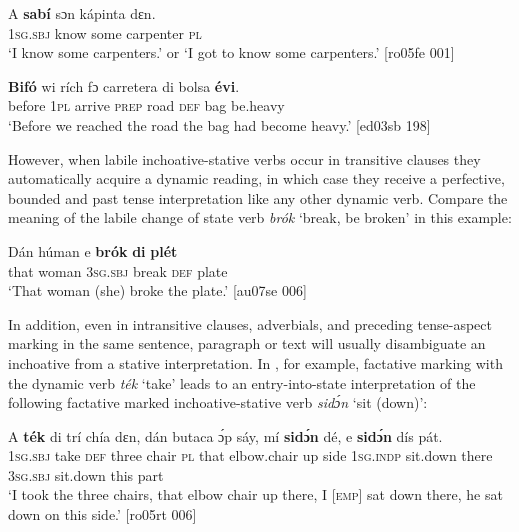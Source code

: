 \ea%
    \label{ex:key:316}
    \gll \MakeUppercase{A}   \textbf{sabí}    sɔn    kápinta    dɛn.\\
\textsc{1sg.sbj}  know  some  carpenter  \textsc{pl}\\

\glt ‘I know some carpenters.’ or ‘I got to know some carpenters.’ [ro05fe 001]
\z


\ea%
    \label{ex:key:317}
    \gll \textbf{Bifó}    wi  rích    fɔ  carretera  di  bolsa  \textbf{évi}.\\
before  \textsc{1pl}  arrive  \textsc{prep}  road      \textsc{def}  bag    be.heavy\\

\glt ‘Before we reached the road the bag had become heavy.’ [ed03sb 198]
\z

However, when labile inchoative-stative verbs occur in transitive clauses they automatically acquire a dynamic reading, in which case they receive a perfective, bounded and past tense interpretation like any other dynamic verb. Compare the meaning of the labile change of state verb \textit{brók} `break, be broken’ in this example: 


\ea%
    \label{ex:key:318}
    \gll Dán  húman  e    \textbf{brók}  \textbf{di}   \textbf{plét}\\
that  woman  \textsc{3sg.sbj}  break  \textsc{def}   plate\\

\glt ‘That woman (she) broke the plate.’ [au07se 006]
\z

In addition, even in intransitive clauses, adverbials, and preceding tense-aspect marking in the same sentence, paragraph or text will usually disambiguate an inchoative from a stative interpretation. In , for example, factative marking with the dynamic verb \textit{ték} ‘take’ leads to an entry-into-state interpretation of the following factative marked inchoative-stative verb \textit{sidɔ́n} ‘sit (down)’:


\ea%
    \label{ex:key:319}
    \gll \MakeUppercase{A}   \textbf{ték}    di  trí    chía    dɛn,    dán    butaca    ɔ́p  sáy,
mí    \textbf{sidɔ́n}  dé,    e    \textbf{sidɔ́n}  dís  pát.\\
\textsc{1sg.sbj}  take    \textsc{def}  three  chair  \textsc{pl}    that    elbow.chair  up  side
\textsc{1sg.indp}  sit.down  there  \textsc{3sg.sbj}  sit.down  this  part\\

\glt ‘I took the three chairs, that elbow chair up there, I \textsc{[emp]} sat down 
there, he sat down on this side.’ [ro05rt 006]
\z

